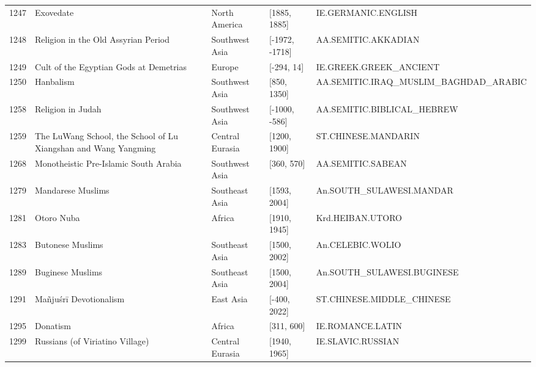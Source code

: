 {\begin{longtable}{rp{3.5cm}llp{3.5cm}}
1247 & {\raggedright Exovedate} & North America & [1885, 1885] & {\raggedright IE.\allowbreak{}GERMANIC.\allowbreak{}ENGLISH} \\
1248 & {\raggedright Religion in the Old Assyrian Period} & Southwest Asia & [-1972, -1718] & {\raggedright AA.\allowbreak{}SEMITIC.\allowbreak{}AKKADIAN} \\
1249 & {\raggedright Cult of the Egyptian Gods at Demetrias} & Europe & [-294, 14] & {\raggedright IE.\allowbreak{}GREEK.\allowbreak{}GREEK\_\allowbreak{}ANCIENT} \\
1250 & {\raggedright Hanbalism} & Southwest Asia & [850, 1350] & {\raggedright AA.\allowbreak{}SEMITIC.\allowbreak{}IRAQ\_\allowbreak{}MUSLIM\_\allowbreak{}BAGHDAD\_\allowbreak{}ARABIC} \\
1258 & {\raggedright Religion in Judah} & Southwest Asia & [-1000, -586] & {\raggedright AA.\allowbreak{}SEMITIC.\allowbreak{}BIBLICAL\_\allowbreak{}HEBREW} \\
1259 & {\raggedright The LuWang School, the School of Lu Xiangshan and Wang Yangming} & Central Eurasia & [1200, 1900] & {\raggedright ST.\allowbreak{}CHINESE.\allowbreak{}MANDARIN} \\
1268 & {\raggedright Monotheistic Pre-Islamic South Arabia} & Southwest Asia & [360, 570] & {\raggedright AA.\allowbreak{}SEMITIC.\allowbreak{}SABEAN} \\
1279 & {\raggedright Mandarese Muslims} & Southeast Asia & [1593, 2004] & {\raggedright An.\allowbreak{}SOUTH\_\allowbreak{}SULAWESI.\allowbreak{}MANDAR} \\
1281 & {\raggedright Otoro Nuba} & Africa & [1910, 1945] & {\raggedright Krd.\allowbreak{}HEIBAN.\allowbreak{}UTORO} \\
1283 & {\raggedright Butonese Muslims} & Southeast Asia & [1500, 2002] & {\raggedright An.\allowbreak{}CELEBIC.\allowbreak{}WOLIO} \\
1289 & {\raggedright Buginese Muslims} & Southeast Asia & [1500, 2004] & {\raggedright An.\allowbreak{}SOUTH\_\allowbreak{}SULAWESI.\allowbreak{}BUGINESE} \\
1291 & {\raggedright Mañjuśrī Devotionalism} & East Asia & [-400, 2022] & {\raggedright ST.\allowbreak{}CHINESE.\allowbreak{}MIDDLE\_\allowbreak{}CHINESE} \\
1295 & {\raggedright Donatism} & Africa & [311, 600] & {\raggedright IE.\allowbreak{}ROMANCE.\allowbreak{}LATIN} \\
1299 & {\raggedright Russians (of Viriatino Village)} & Central Eurasia & [1940, 1965] & {\raggedright IE.\allowbreak{}SLAVIC.\allowbreak{}RUSSIAN} \\

\end{longtable}}
